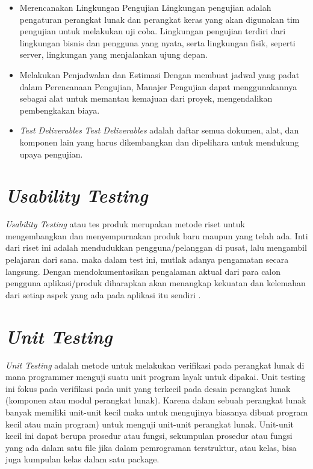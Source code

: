 \begin{itemize}
	\newpage
	\item Merencanakan Lingkungan Pengujian
	\newline Lingkungan pengujian adalah pengaturan perangkat lunak dan perangkat keras yang akan digunakan tim pengujian untuk melakukan uji coba. Lingkungan pengujian terdiri dari lingkungan bisnis dan pengguna yang nyata, serta lingkungan fisik, seperti server, lingkungan yang menjalankan ujung depan.
	
	\item {Melakukan Penjadwalan dan Estimasi}
	 \newline Dengan membuat jadwal yang padat dalam Perencanaan Pengujian, Manajer Pengujian dapat menggunakannya sebagai alat untuk memantau kemajuan dari proyek, mengendalikan pembengkakan biaya.
	 
	 \item {\textit{Test Deliverables}}
	 \newline \textit{Test Deliverables} adalah daftar semua dokumen, alat, dan komponen lain yang harus dikembangkan dan dipelihara untuk mendukung upaya pengujian.
	
\end{itemize}

\section {\textit{Usability Testing}}
\par \textit{Usability Testing} atau tes produk merupakan metode riset untuk mengembangkan dan menyempurnakan produk baru maupun yang telah ada. Inti dari riset ini adalah mendudukkan pengguna/pelanggan di pusat, lalu mengambil pelajaran dari sana. maka dalam test ini, mutlak adanya pengamatan secara langsung. Dengan mendokumentasikan pengalaman aktual dari para calon pengguna aplikasi/produk diharapkan akan menangkap kekuatan dan kelemahan dari setiap aspek yang ada pada aplikasi itu sendiri \citep{nielsen2012}.

\section {\textit{Unit Testing}}
\textit{Unit Testing} adalah metode untuk melakukan verifikasi pada perangkat lunak di mana programmer menguji suatu unit program layak untuk dipakai. Unit testing ini fokus pada verifikasi pada unit yang terkecil pada desain perangkat lunak (komponen atau modul perangkat lunak). Karena dalam sebuah perangkat lunak banyak memiliki unit-unit kecil maka untuk mengujinya biasanya dibuat program kecil atau main program) untuk menguji unit-unit perangkat lunak. Unit-unit kecil ini dapat berupa prosedur atau fungsi, sekumpulan prosedur atau fungsi yang ada dalam satu file jika dalam pemrograman terstruktur, atau kelas, bisa juga kumpulan kelas dalam satu package. \citep{rosa2013rekayasa}

